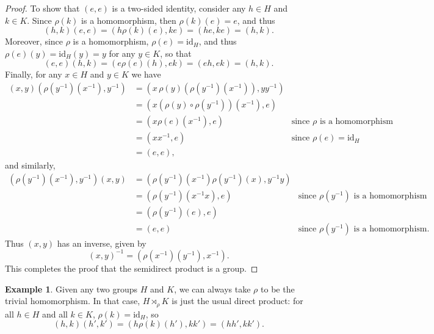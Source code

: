 \documentclass[12pt]{report}
\numberwithin{equation}{section}
\numberwithin{theorem}{chapter}
\theoremstyle{definition}
\newtheorem{example}[theorem]{Example}
\newtheorem*{basic properties}{Basic Properties}
\newtheorem*{Important Remark}{Important Remark}
\def\sdp{\rtimes}
\begin{document}
\begin{proof}
To show that $(e,e)$ is a two-sided identity, consider any $h \in H$ and $k \in K$. Since $\rho(k)$ is a homomorphism, then $\rho(k)(e) = e$, and thus
$$(h,k)(e,e) = (h\rho(k)(e),ke) = (he,ke) = (h,k).$$
Moreover, since $\rho$ is a homomorphism, $\rho(e) = \mathrm{id}_H$, and thus $\rho(e)(y) = \mathrm{id}_H(y)=y$ for any $y \in K$, so that
$$(e,e)(h,k) = (e\rho(e)(h),ek) = (eh,ek)=(h,k).$$
Finally, for any $x \in H$ and $y \in K$ we have
%
$$\begin{aligned}
(x,y) (\rho(y^{-1})(x^{-1}), y^{-1}) &= (x \, \rho(y)\left(\rho(y^{-1})(x^{-1}) \right), yy^{-1})\\
& = (x (\rho(y) \circ \rho(y^{-1}))(x^{-1}), e) \\
&= (x \rho(e)(x^{-1}), e) & \textrm{since $\rho$ is a homomorphism} \\
& = (xx^{-1},e) & \text{since } \rho(e) = \mathrm{id}_H\\ 
& =(e,e),
\end{aligned}$$
and similarly,
$$\begin{aligned}
(\rho(y^{-1})(x^{-1}), y^{-1}) (x,y) &= (\rho(y^{-1})(x^{-1}) \rho(y^{-1})(x),y^{-1}y) \\
& = (\rho(y^{-1})(x^{-1}x), e) & \textrm{since } \rho(y^{-1}) \text{ is a homomorphism} \\
& = (\rho(y^{-1})(e), e) \\
& = (e, e) & \textrm{since } \rho(y^{-1}) \text{ is a homomorphism.} 
\end{aligned}$$
Thus $(x,y)$ has an inverse, given by
$$(x,y)^{-1} = (\rho(x^{-1})(y^{-1}) ,x^{-1}).$$
This completes the proof that the semidirect product is a group.
\end{proof}




\begin{example}\label{semidirect product is direct if trivial}
Given any two groups $H$ and $K$, we can always take $\rho$ to be the trivial homomorphism. In that case, $H \sdp_\rho K$ is just the usual direct product: for all $h \in H$ and all $k \in K$, $\rho(k) = \mathrm{id}_H$, so
$$(h,k)(h',k') = (h\rho(k)(h'),kk') = (hh',kk').$$
\end{example}
\end{document}
